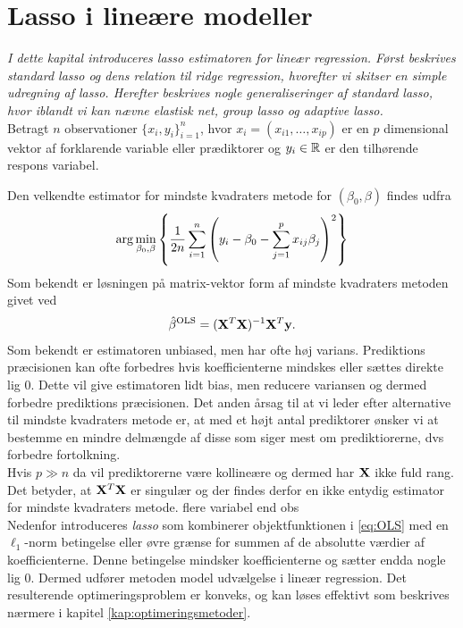 \chapter{Lasso i lineære modeller}
\textit{I dette kapital introduceres lasso estimatoren for lineær regression. 
Først beskrives standard lasso og dens relation til ridge regression, hvorefter vi skitser en simple udregning af lasso.
Herefter beskrives nogle generaliseringer af standard lasso, hvor iblandt vi kan nævne elastisk net, group lasso og adaptive lasso.} \\[4mm]
%
Betragt \(n\) observationer \(\{x_i, y_i\}_{i=1}^n \), hvor $x_i=(x_{i1}, \ldots, x_{ip})$ er en $p$ dimensional vektor af forklarende variable eller prædiktorer og $y_i \in \mathbb{R}$ er den tilhørende respons variabel.

Den velkendte estimator for mindste kvadraters metode for $(\beta_0, \beta)$ findes udfra
\begin{align}
\arg \min_{\beta_0, \beta} \cbr{\frac{1}{2n} \sum_{i=1}^n \del{y_i - \beta_0 - \sum_{j=1}^p x_{ij} \beta_j}^2} \label{eq:OLS}
\end{align}
Som bekendt er løsningen på matrix-vektor form af mindste kvadraters metoden givet ved
\begin{align*}
\hat{\beta}^{\text{OLS}} = (\mathbf{X}^T \mathbf{X})^{-1} \mathbf{X}^T \mathbf{y}.
\end{align*}
Som bekendt er estimatoren unbiased, men har ofte høj varians. 
Prediktions præcisionen kan ofte forbedres hvis koefficienterne mindskes eller sættes direkte lig 0.
Dette vil give estimatoren lidt bias, men reducere variansen og dermed forbedre prediktions præcisionen.
Det anden årsag til at vi leder efter alternative til mindste kvadraters metode er, at med et højt antal prediktorer ønsker vi at bestemme en mindre delmængde af disse som siger mest om prediktiorerne, dvs forbedre fortolkning.\\[4mm]

Hvis \(p \gg n\) da vil prediktorerne være kollineære og dermed har \(\mathbf{X}\) ikke fuld rang.
Det betyder, at $\mathbf{X}^T \mathbf{X}$ er singulær og der findes derfor en ikke entydig estimator for mindste kvadraters metode.
flere variabel end obs \\[4mm]
%
Nedenfor introduceres \textit{lasso} som kombinerer objektfunktionen i \eqref{eq:OLS} med en $\ell_1$-norm betingelse eller øvre grænse for summen af de absolutte værdier af koefficienterne.
Denne betingelse mindsker koefficienterne og sætter endda nogle lig 0. 
Dermed udfører metoden model udvælgelse i lineær regression.
Det resulterende optimeringsproblem er konveks, og kan løses effektivt som beskrives nærmere i kapitel \ref{kap:optimeringsmetoder}.


